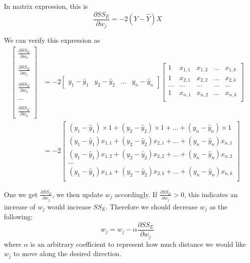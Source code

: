 \documentclass[
	letterpaper
]{article}
\begin{document}
In matrix expression, this is
\begin{equation}
\frac{\partial SS_E}{\partial w_j} = -2 (Y - \hat Y)X
\end{equation}

We can verify this expression as 
\begin{equation}
\begin{split}
\begin{bmatrix}\frac{\partial SS_E}{\partial w_0} \\ \\ \frac{\partial SS_E}{\partial w_1} \\ \\  \frac{\partial SS_E}{\partial w_2}  \\ \\ ... \\  \\ \frac{\partial SS_E}{\partial w_k}\end{bmatrix}
& = -2 \begin{bmatrix}y_1 - \hat y_1 & y_2 - \hat y_2 & ... & y_n - \hat y_n\end{bmatrix}
\begin{bmatrix}
1 & x_{1, 1} & x_{1, 2} & ... & x_{1, k} \\
1 & x_{2, 1} & x_{2, 2} & ... & x_{2, k} \\
... & ... & ... & ... & ... \\
1 & x_{n, 1} & x_{n, 2} & ... & x_{n, k} \\
\end{bmatrix}\\
& = -2 \begin{bmatrix}
(y_1 - \hat y_1)\times 1  + (y_2 - \hat y_2) \times 1 + ... + (y_n - \hat y_n) \times 1 \\
(y_1 - \hat y_1)  x_{1,1} + (y_2 - \hat y_2)  x_{2,1} + ... + (y_n - \hat y_n)  x_{n,1}\\
(y_1 - \hat y_1)  x_{1,2} + (y_2 - \hat y_2)  x_{2,2} + ... + (y_n - \hat y_n)  x_{n,2}\\
...\\
(y_1 - \hat y_1)  x_{1,k} + (y_2 - \hat y_2)  x_{2,k} + ... + (y_n - \hat y_n)  x_{n,k}\\
\end{bmatrix}
\end{split}
\end{equation}

One we get $\frac{\partial SS_E}{\partial w_j}$, we then update $w_j$ accordingly.
If $\frac{\partial SS_E}{\partial w_j} > 0$, this indicates an increase of $w_j$ would increase $SS_E$.
Therefore we should decrease $w_j$ as the following:
\begin{equation}
w_j = w_j - \alpha \frac{\partial SS_E}{\partial w_j} 
\end{equation}
where $\alpha$ is an arbitrary coefficient to represent how much distance we would like $w_j$ to move along the desired direction.
 
\end{document}
